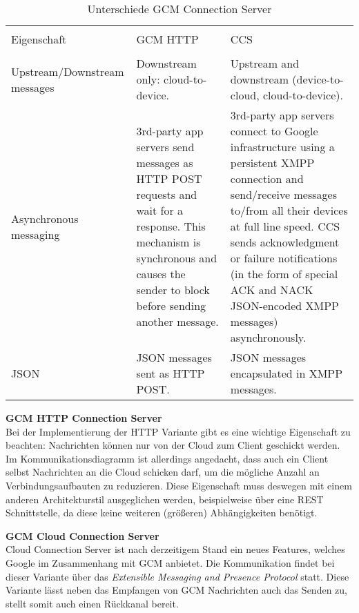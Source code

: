 \begin{table}[H]
\caption{Unterschiede GCM Connection Server}

\centering
\begin{tabular}{ p{4cm} p{5cm} p{5cm} }
\\ [-0.5ex]

\hline\hline
\\ [-0.5ex]
Eigenschaft & GCM HTTP & CCS
\\ [1.5ex]
\hline
\\ [-0.5ex]
Upstream/Downstream messages & Downstream only: cloud-to-device. & Upstream and downstream (device-to-cloud, cloud-to-device). \\[1.5ex]
Asynchronous messaging & 3rd-party app servers send messages as HTTP POST requests and wait for a response. This mechanism is synchronous and causes the sender to block before sending another message. & 3rd-party app servers connect to Google infrastructure using a persistent XMPP connection and send/receive messages to/from all their devices at full line speed. CCS sends acknowledgment or failure notifications (in the form of special ACK and NACK JSON-encoded XMPP messages) asynchronously.\\[1.5ex]
JSON & JSON messages sent as HTTP POST. & JSON messages encapsulated in XMPP messages.\\[1.5ex]
\hline
\end{tabular}
\label{tab:unterschiedegcmconnectionserver}
\end{table}


\textbf{GCM HTTP Connection Server}\\
Bei der Implementierung der HTTP Variante gibt es eine wichtige Eigenschaft zu beachten: Nachrichten können nur von der Cloud zum Client geschickt werden. Im Kommunikationsdiagramm ist allerdings angedacht, dass auch ein Client selbst Nachrichten an die Cloud schicken darf, um die mögliche Anzahl an Verbindungsaufbauten zu reduzieren.
Diese Eigenschaft muss deswegen mit einem anderen Architekturstil ausgeglichen werden, beispielweise über eine REST Schnittstelle, da diese keine weiteren (größeren) Abhängigkeiten benötigt.


\textbf{GCM Cloud Connection Server}\\
Cloud Connection Server ist nach derzeitigem Stand ein neues Features, welches Google im Zusammenhang mit GCM anbietet. Die Kommunikation findet bei dieser Variante über das \textit{Extensible Messaging and Presence Protocol} statt.
Diese Variante lässt neben das Empfangen von GCM Nachrichten auch das Senden zu, stellt somit auch einen Rückkanal bereit.


